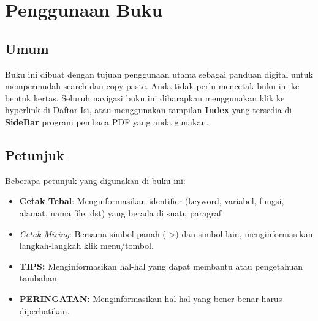 \documentclass[12pt]{book}
\begin{document}
	\newpage
	\chapter{Penggunaan Buku}

	\section{Umum}
	Buku ini dibuat dengan tujuan penggunaan utama sebagai panduan digital untuk mempermudah search dan copy-paste.
	Anda tidak perlu mencetak buku ini ke bentuk kertas.
	Seluruh navigasi buku ini diharapkan menggunakan klik ke hyperlink di Daftar Isi,
	atau menggunakan tampilan \textbf{Index} yang tersedia di \textbf{SideBar} program pembaca PDF yang anda gunakan.

	\section{Petunjuk}
	Beberapa petunjuk yang digunakan di buku ini:
	\begin{itemize}
		\item \textbf{Cetak Tebal}: Menginformasikan identifier (keyword, variabel, fungsi, alamat, nama file, dst) yang berada di suatu paragraf
		\item \textit{Cetak Miring}: Bersama simbol panah (->) dan simbol lain, menginformasikan langkah-langkah klik menu/tombol.
		\item \textbf{TIPS:} Menginformasikan hal-hal yang dapat membantu atau pengetahuan tambahan.
		\item \textbf{PERINGATAN:} Menginformasikan hal-hal yang bener-benar harus diperhatikan.
	\end{itemize}
\end{document}
